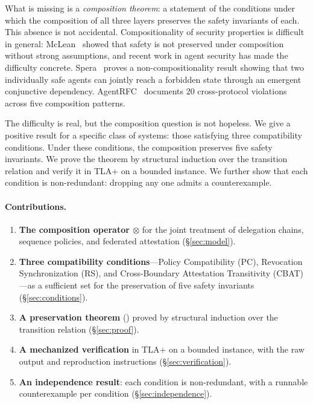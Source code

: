 \documentclass[11pt,a4paper]{article}
\theoremstyle{plain}
\theoremstyle{definition}
\theoremstyle{remark}
\begin{document}
What is missing is a \emph{composition theorem}: a statement of the conditions
under which the composition of all three layers preserves the safety invariants
of each. This absence is not accidental. Compositionality of security
properties is difficult in general: McLean~\cite{mclean1994general} showed that
safety is not preserved under composition without strong assumptions, and
recent work in agent security has made the difficulty concrete.
Spera~\cite{spera2026noncompositionality} proves a non-compositionality result
showing that two individually safe agents can jointly reach a forbidden state
through an emergent conjunctive dependency. AgentRFC~\cite{agentrfc2026}
documents 20 cross-protocol violations across five composition patterns.

The difficulty is real, but the composition question is not hopeless. We give
a positive result for a specific class of systems: those satisfying three
compatibility conditions. Under these conditions, the composition preserves
five safety invariants. We prove the theorem by structural induction over the
transition relation and verify it in TLA+ on a bounded instance. We further
show that each condition is non-redundant: dropping any one admits a
counterexample.

\paragraph{Contributions.}

\begin{enumerate}
  \item \textbf{The composition operator $\otimes$} for the joint treatment of
  delegation chains, sequence policies, and federated attestation
  (\S\ref{sec:model}).
  \item \textbf{Three compatibility conditions}---Policy Compatibility (PC),
  Revocation Synchronization (RS), and Cross-Boundary Attestation
  Transitivity (CBAT)---as a sufficient set for the preservation of five
  safety invariants (\S\ref{sec:conditions}).
  \item \textbf{A preservation theorem} () proved by
  structural induction over the transition relation
  (\S\ref{sec:proof}).
  \item \textbf{A mechanized verification} in TLA+ on a bounded instance, with
  the raw output and reproduction instructions (\S\ref{sec:verification}).
  \item \textbf{An independence result}: each condition is non-redundant, with
  a runnable counterexample per condition (\S\ref{sec:independence}).
\end{enumerate}
\end{document}
